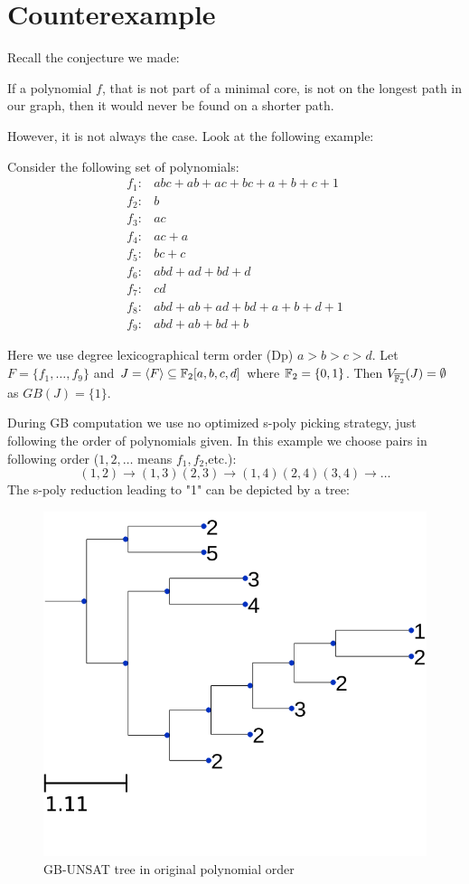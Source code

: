 \section{Counterexample}

Recall the conjecture we made:
\begin{Conjecture}
\label{conj:original}
If a polynomial $f$, that is not part of a minimal core, is not on the longest path in our graph, 
then it would never be found on a shorter path.
\end{Conjecture}
However, it is not always the case. Look at the following example:

\begin{Example}
\label{exi}
Consider the following set of polynomials:
\begin{align*}
f_1: & abc+ab+ac+bc+a+b+c+1\\
f_2: & b\\
f_3: & ac\\
f_4: & ac+a\\
f_5: & bc+c\\
f_6: & abd+ad+bd+d\\
f_7: & cd\\
f_8: & abd+ab+ad+bd+a+b+d+1\\
f_9: & abd+ab+bd+b
\end{align*}

Here we use degree lexicographical term order (Dp) $a>b>c>d$. Let $F = \{f_1, \dots, f_9\}$ and $J = \langle F \rangle \subseteq
{\mathbb{F}}_2[a, b, c, d]$ where ${\mathbb{F}}_2 = \{0, 1\}$. Then
$V_{\overline{{\mathbb{F}}_2}}(J) = \emptyset$ as $GB(J) = \{1\}$. 

During GB computation we use no optimized s-poly picking strategy, just following the order of polynomials given.
In this example we choose pairs in following order ($1,2,\dots$ means $f_1,f_2$,etc.):
$$(1,2) \to (1,3)(2,3) \to (1,4)(2,4)(3,4) \to \dots$$
The s-poly reduction leading to "1" can be depicted by a tree:
\begin{figure}[hbt]
\centering
\includegraphics[scale=0.6]{tier1.png}
\caption{GB-UNSAT tree in original polynomial order}
\label{fig:tier1}
\end{figure}


\end{Example}

